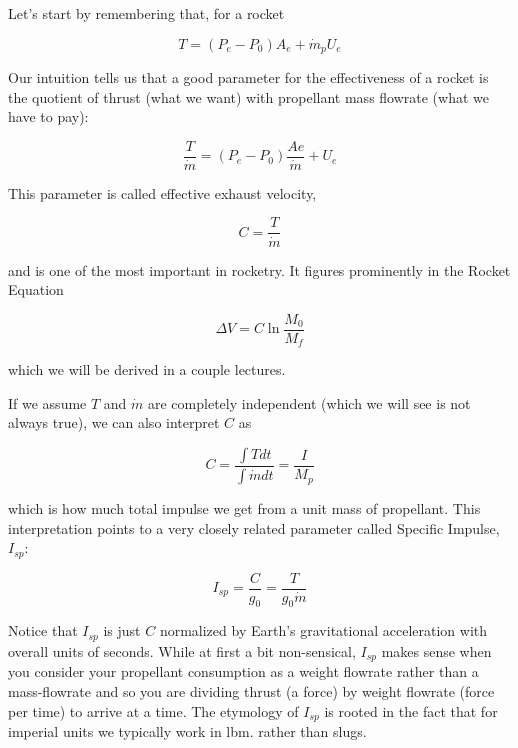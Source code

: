 \documentclass[twocolumn]{memoir} %
\begin{document}
Let's start by remembering that, for a rocket

\begin{equation}T = (P_e - P_0)A_e + \dot{m}_pU_e
\end{equation}

Our intuition tells us that a good parameter for the effectiveness of a
rocket is the quotient of thrust (what we want) with propellant mass
flowrate (what we have to pay):

\begin{equation}\frac{T}{\dot{m}} = (P_e - P_0)\frac{Ae}{\dot{m}} + U_e
\end{equation}

This parameter is called effective exhaust velocity,


\begin{equation}
    C = \frac{T}{\dot{m}}
\end{equation}

and is one of the most important in rocketry.
It figures prominently in the Rocket Equation

\begin{equation}\Delta V = C \ln \frac{M_0}{M_f}
\end{equation}

which we will be derived in a couple lectures.

If we assume $T$ and $\dot{m}$ are completely independent (which we
will see is not always true), we can also interpret $C$ as

\begin{equation}C = \frac{\int T dt}{\int \dot{m} dt} = \frac{I}{M_p}
\end{equation}

which is how much total impulse we get from a unit mass of propellant.
This interpretation points to a very closely related parameter called
Specific Impulse, $I_{sp}$:

\begin{equation}I_{sp} = \frac{C}{g_0} = \frac{T}{g_0\dot{m}}
\end{equation}

Notice that $I_{sp}$ is just $C$ normalized by Earth's gravitational
acceleration with overall units of seconds. While at first a bit
non-sensical, $I_{sp}$ makes sense when you consider your propellant
consumption as a weight flowrate rather than a mass-flowrate and so you
are dividing thrust (a force) by weight flowrate (force per time) to
arrive at a time. The etymology of $I_{sp}$ is rooted in the fact that
for imperial units we typically work in lbm. rather than slugs.
\end{document}
